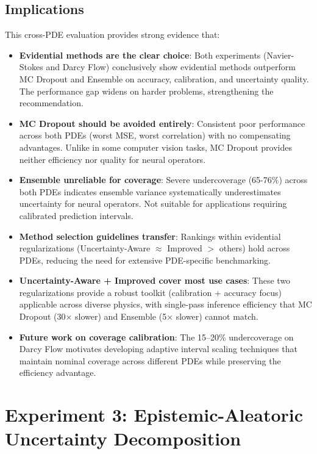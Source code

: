 \subsection{Implications}

This cross-PDE evaluation provides strong evidence that:
\begin{itemize}
\item \textbf{Evidential methods are the clear choice}: Both experiments (Navier-Stokes and Darcy Flow) conclusively show evidential methods outperform MC Dropout and Ensemble on accuracy, calibration, and uncertainty quality. The performance gap widens on harder problems, strengthening the recommendation.

\item \textbf{MC Dropout should be avoided entirely}: Consistent poor performance across both PDEs (worst MSE, worst correlation) with no compensating advantages. Unlike in some computer vision tasks, MC Dropout provides neither efficiency nor quality for neural operators.

\item \textbf{Ensemble unreliable for coverage}: Severe undercoverage (65-76\%) across both PDEs indicates ensemble variance systematically underestimates uncertainty for neural operators. Not suitable for applications requiring calibrated prediction intervals.

\item \textbf{Method selection guidelines transfer}: Rankings within evidential regularizations (Uncertainty-Aware $\approx$ Improved $>$ others) hold across PDEs, reducing the need for extensive PDE-specific benchmarking.

\item \textbf{Uncertainty-Aware + Improved cover most use cases}: These two regularizations provide a robust toolkit (calibration + accuracy focus) applicable across diverse physics, with single-pass inference efficiency that MC Dropout (30× slower) and Ensemble (5× slower) cannot match.

\item \textbf{Future work on coverage calibration}: The 15--20\% undercoverage on Darcy Flow motivates developing adaptive interval scaling techniques that maintain nominal coverage across different PDEs while preserving the efficiency advantage.
\end{itemize}

\section{Experiment 3: Epistemic-Aleatoric Uncertainty Decomposition}

